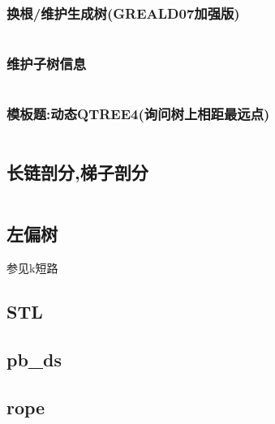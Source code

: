 \documentclass[a4paper]{article}
\begin{document}
\begin{multicols}{2}
					\subsubsection{换根/维护生成树(GREALD07加强版)}
						\inputminted{cpp}{../src/数据结构/GREALD07.cpp}

					\subsubsection{维护子树信息}
						\inputminted{cpp}{../src/数据结构/LCT维护子树信息.cpp}
					
					\subsubsection{模板题:动态QTREE4(询问树上相距最远点)}
						\inputminted{cpp}{../src/数据结构/动态QTREE4.cpp}







				\subsection{长链剖分,梯子剖分}
					\inputminted{cpp}{../src/数据结构/长链剖分.cpp}
				
				\subsection{左偏树}
					参见k短路

				\subsection{STL}


				\subsection{pb\_ds}


				\subsection{rope}



\end{multicols}
\end{document}
